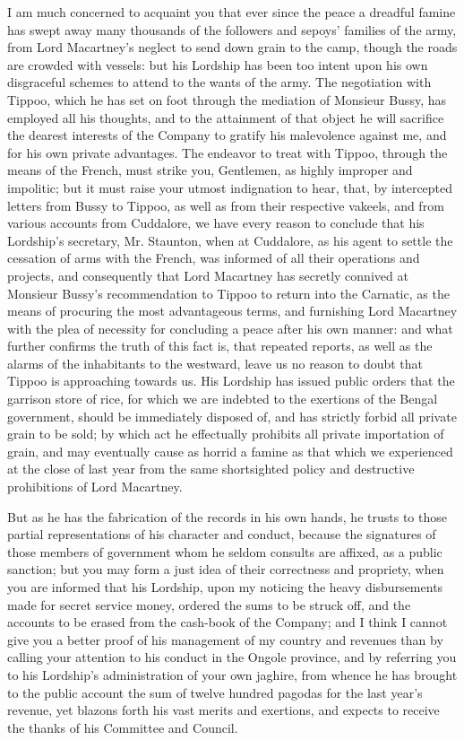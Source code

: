 I am much concerned to acquaint you that ever since the peace a dreadful famine has swept away many thousands of the followers and sepoys' families of the army, from Lord Macartney's neglect to send down grain to the camp, though the roads are crowded with vessels: but his Lordship has been too intent upon his own disgraceful schemes to attend to the wants of the army. The negotiation with Tippoo, which he has set on foot through the mediation of Monsieur Bussy, has employed all his thoughts, and to the attainment of that object he will sacrifice the dearest interests of the Company to gratify his malevolence against me, and for his own private advantages. The endeavor to treat with Tippoo, through the means of the French, must strike you, Gentlemen, as highly improper and impolitic; but it must raise your utmost indignation to hear, that, by intercepted letters from Bussy to Tippoo, as well as from their respective vakeels, and from various accounts from Cuddalore, we have every reason to conclude that his Lordship's secretary, Mr. Staunton, when at Cuddalore, as his agent to settle the cessation of arms with the French, was informed of all their operations and projects, and consequently that Lord Macartney has secretly connived at Monsieur Bussy's recommendation to Tippoo to return into the Carnatic, as the means of procuring the most advantageous terms, and furnishing Lord Macartney with the plea of necessity for concluding a peace after his own manner: and what further confirms the truth of this fact is, that repeated reports, as well as the alarms of the inhabitants to the westward, leave us no reason to doubt that Tippoo is approaching towards us. His Lordship has issued public orders that the garrison store of rice, for which we are indebted to the exertions of the Bengal government, should be immediately disposed of, and has strictly forbid all private grain to be sold; by which act he effectually prohibits all private importation of grain, and may eventually cause as horrid a famine as that which we experienced at the close of last year from the same shortsighted policy and destructive prohibitions of Lord Macartney.

But as he has the fabrication of the records in his own hands, he trusts to those partial representations of his character and conduct, because the signatures of those members of government whom he seldom consults are affixed, as a public sanction; but you may form a just idea of their correctness and propriety, when you are informed that his Lordship, upon my noticing the heavy disbursements made for secret service money, ordered the sums to be struck off, and the accounts to be erased from the cash-book of the Company; and I think I cannot give you a better proof of his management of my country and revenues than by calling your attention to his conduct in the Ongole province, and by referring you to his Lordship's administration of your own jaghire, from whence he has brought to the public account the sum of twelve hundred pagodas for the last year's revenue, yet blazons forth his vast merits and exertions, and expects to receive the thanks of his Committee and Council.

